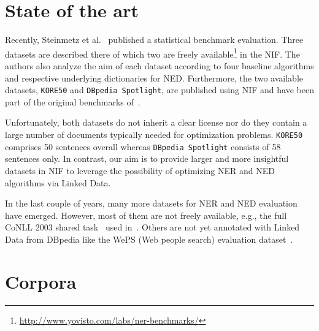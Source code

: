 \section{State of the art}

Recently, Steinmetz et al.~\cite{NEDstatBench} published a statistical benchmark evaluation.
Three datasets are described there of which two are freely available\footnote{\url{http://www.yovisto.com/labs/ner-benchmarks/}} in the NIF.
The authors also analyze the aim of each dataset according to four baseline algorithms and respective underlying dictionaries for NED.
Furthermore, the two available datasets, \texttt{KORE50} and \texttt{DBpedia Spotlight}, are published using NIF and have been part of the original benchmarks of~\cite{AIDA,spotlight}. 

Unfortunately, both datasets do not inherit a clear license nor do they contain a large number of documents typically needed for optimization problems. %
\texttt{KORE50} comprises 50 sentences overall whereas \texttt{DBpedia Spotlight} consists of 58 sentences only. 
In contrast, our aim is to provide larger and more insightful datasets in NIF to leverage the possibility of optimizing NER and NED algorithms via Linked Data.

In the last couple of years, many more datasets for NER and NED evaluation have emerged.
However, most of them are not freely available, e.g., the full CoNLL 2003 shared task~\cite{conll2003} used in~\cite{AIDA}.
Others are not yet annotated with Linked Data from DBpedia like the WePS (Web people search) evaluation dataset~\cite{WEPS}.

\section{Corpora}
\label{n3:sec:Features}

\begin{table}
	\centering
	\caption{Features of the corpora and their documents.}
	\label{n3:tab:corpus_stats}
\end{table}

